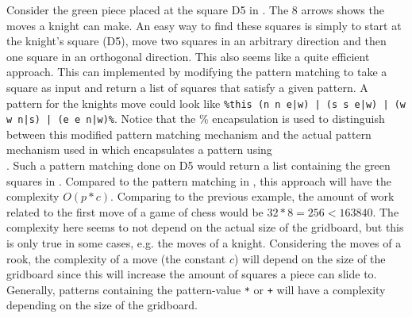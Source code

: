 Consider the green piece placed at the square D5 in . The 8 arrows shows the moves a knight can make. An easy way to find these squares is simply to start at the knight's square (D5), move two squares in an arbitrary direction and then one square in an orthogonal direction. This also seems like a quite efficient approach. This can implemented by modifying the pattern matching to take a square as input and return a list of squares that satisfy a given pattern. A pattern for the knights move could look like \texttt{\%this (n n e|w) | (s s e|w) | (w w n|s) | (e e n|w)\%}. Notice that the \% encapsulation is used to distinguish between this modified pattern matching mechanism and the actual pattern mechanism used in \productname{} which encapsulates a pattern using \\. Such a pattern matching done on D5 would return a list containing the green squares in .
Compared to the pattern matching in \productname{}, this approach will have the complexity $O(p * c)$. Comparing to the previous example, the amount of work related to the first move of a game of chess would be $32 * 8 = 256 < 163840.$ The complexity here seems to not depend on the actual size of the gridboard, but this is only true in some cases, e.g. the moves of a knight. Considering the moves of a rook, the complexity of a move (the constant $c$) will depend on the size of the gridboard since this will increase the amount of squares a piece can slide to. Generally, patterns containing the pattern-value \texttt{*} or \texttt{+} will have a complexity depending on the size of the gridboard.

